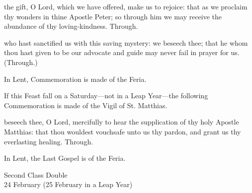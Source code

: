 
\postcommunion
{} the gift, O Lord, which we have offered, make us to rejoice: that as we proclaim thy wonders in thine Apostle Peter; so through him we may receive the abundance of thy loving-kindness. Through.

 who hast sanctified us with this saving mystery: we beseech thee; that he whom thou hast given to be our advocate and guide may never fail in prayer for us. (Through.)
\begin{rubric}
    In Lent, Commemoration is made of the Feria.%
\end{rubric}
\begin{rubric}
    If this Feast fall on a Saturday---not in a Leap Year---the following Commemoration is made of the Vigil of St. Matthias.
\end{rubric}
 beseech thee, O Lord, mercifully to hear the supplication of thy holy Apostle Matthias: that thou wouldest vouchsafe unto us thy pardon, and grant us thy everlasting healing. Through.
\begin{rubric}
    In Lent, the Last Gospel is of the Feria.
\end{rubric}

\begin{inhead}
    {Second Class Double\\
24 February (25 February in a Leap Year)}
\end{inhead}

